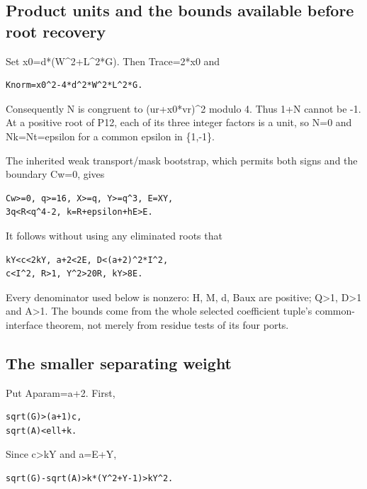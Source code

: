 \documentclass[
  10pt,
]{article}
\begin{document}
\subsection{Product units and the bounds available before root
recovery}\label{product-units-and-the-bounds-available-before-root-recovery}

Set x0=d*(W\^{}2+L\^{}2*G). Then Trace=2*x0 and

\begin{verbatim}
Knorm=x0^2-4*d^2*W^2*L^2*G.
\end{verbatim}

Consequently N is congruent to (ur+x0*vr)\^{}2 modulo 4. Thus 1+N cannot
be -1. At a positive root of P12, each of its three integer factors is a
unit, so N=0 and Nk=Nt=epsilon for a common epsilon in \{1,-1\}.

The inherited weak transport/mask bootstrap, which permits both signs
and the boundary Cw=0, gives

\begin{verbatim}
Cw>=0, q>=16, X>=q, Y>=q^3, E=XY,
3q<R<q^4-2, k=R+epsilon+hE>E.
\end{verbatim}

It follows without using any eliminated roots that

\begin{verbatim}
kY<c<2kY, a+2<2E, D<(a+2)^2*I^2,
c<I^2, R>1, Y^2>20R, kY>8E.
\end{verbatim}

Every denominator used below is nonzero: H, M, d, Baux are positive;
Q\textgreater1, D\textgreater1 and A\textgreater1. The bounds come from
the whole selected coefficient tuple's common-interface theorem, not
merely from residue tests of its four ports.

\subsection{The smaller separating
weight}\label{the-smaller-separating-weight}

Put Aparam=a+2. First,

\begin{verbatim}
sqrt(G)>(a+1)c,
sqrt(A)<ell+k.
\end{verbatim}

Since c\textgreater kY and a=E+Y,

\begin{verbatim}
sqrt(G)-sqrt(A)>k*(Y^2+Y-1)>kY^2.
\end{verbatim}
\end{document}

